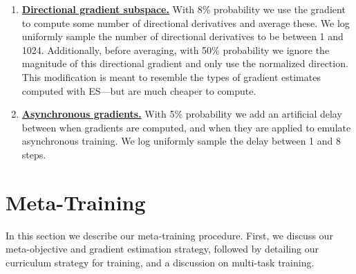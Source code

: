 \documentclass[11pt]{article}
\begin{document}
\begin{enumerate}
    \item \href{https://github.com/google/learned_optimization/blob/a42b207b9ef5395fdf7e64978c26379ccba4e264/learned_optimization/tasks/task_augmentation.py#L445}{\textbf{Directional gradient subspace.}} With 8\% probability we use the gradient to compute some number of directional derivatives and average these. We log uniformly sample the number of directional derivatives to be between 1 and 1024. Additionally, before averaging, with 50\% probability we ignore the magnitude of this directional gradient and only use the normalized direction. This modification is meant to resemble the types of gradient estimates computed with ES---but are much cheaper to compute.
    
    \item \href{https://github.com/google/learned_optimization/blob/a42b207b9ef5395fdf7e64978c26379ccba4e264/learned_optimization/tasks/task_augmentation.py#L533}{\textbf{Asynchronous gradients.}} With 5\% probability we add an artificial delay between when gradients are computed, and when they are applied to emulate asynchronous training. We log uniformly sample the delay between 1 and 8 steps.
\end{enumerate}


\section{Meta-Training}
In this section we describe our meta-training procedure.
First, we discuss our meta-objective and gradient estimation strategy, followed by detailing our curriculum strategy for training, and a discussion on multi-task training.
\end{document}

